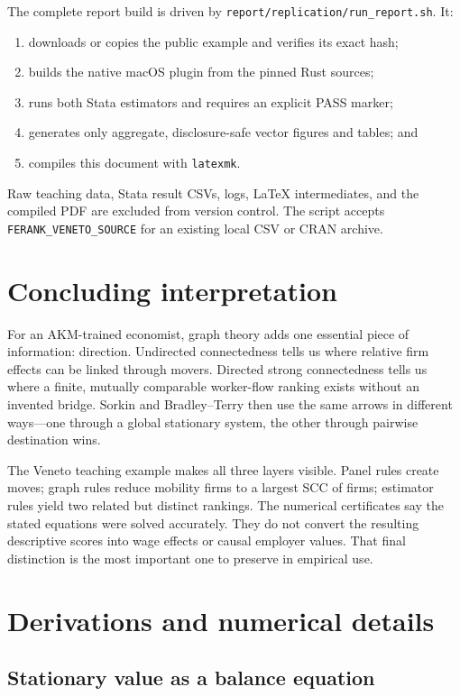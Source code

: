 \documentclass[11pt]{article}
\begin{document}
The complete report build is driven by
\texttt{report/replication/run\_report.sh}. It:
\begin{enumerate}
  \item downloads or copies the public example and verifies its exact hash;
  \item builds the native macOS plugin from the pinned Rust sources;
  \item runs both Stata estimators and requires an explicit PASS marker;
  \item generates only aggregate, disclosure-safe vector figures and tables;
  and
  \item compiles this document with \texttt{latexmk}.
\end{enumerate}
Raw teaching data, Stata result CSVs, logs, LaTeX intermediates, and the compiled
PDF are excluded from version control. The script accepts
\texttt{FERANK\_VENETO\_SOURCE} for an existing local CSV or CRAN archive.

\section{Concluding interpretation}

For an AKM-trained economist, graph theory adds one essential piece of
information: direction. Undirected connectedness tells us where relative firm
effects can be linked through movers. Directed strong connectedness tells us
where a finite, mutually comparable worker-flow ranking exists without an
invented bridge. Sorkin and Bradley--Terry then use the same arrows in different
ways---one through a global stationary system, the other through pairwise
destination wins.

The Veneto teaching example makes all three layers visible. Panel rules create
\VenetoMoves{} moves; graph rules reduce \VenetoGraphFirms{} mobility firms to
a largest SCC of \VenetoLargestSCC{} firms; estimator rules yield two related
but distinct rankings. The numerical certificates say the stated equations
were solved accurately. They do not convert the resulting descriptive scores
into wage effects or causal employer values. That final distinction is the
most important one to preserve in empirical use.

\appendix
\section{Derivations and numerical details}

\subsection{Stationary value as a balance equation}
\end{document}

